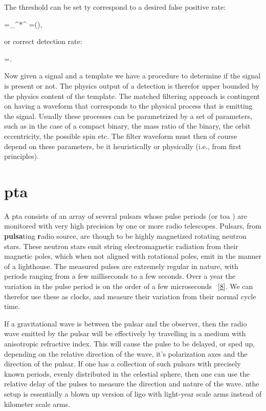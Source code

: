 \documentclass[
  10pt,
  a4paper,
  DIV=11,
  numbers=noendperiod,
  twoside]{scrreprt}
\let\[\relax \let\]\relax %
\DeclareRobustCommand{\[}{\begin{equation}}
\DeclareRobustCommand{\]}{\end{equation}}
\begin{document}
The threshold can be set ty correspond to a desired false positive
rate:

\[=\sqrt{\inv{2\pi}}\int\limits_{\rho^*}^{\infty} \dd{\rho}=\half {}(),\]

or correct detection rate:

\[
=\Half{}.  
\]

Now given a signal and a template we have a procedure to determine if
the signal is present or not. The physics output of a detection is
therefor upper bounded by the physics content of the template. The
matched filtering approach is contingent on having a waveform that
corresponds to the physical process that is emitting the signal. Usually
these processes can be parametrized by a set of parameters, such as in
the case of a compact binary, the mass ratio of the binary, the orbit
eccentricity, the possible spin etc. The filter waveform must then of
course depend on these parameters, be it heuristically or physically
(i.e., from first principles).

\hypertarget{pta}{%
\section{\texorpdfstring{\gls{pta}}{}}\label{pta}}

A \gls{pta} consists of an array of several pulsars whose pulse periods
(or \gls{toa} ) are monitored with very high precision by one or more
radio telescopes. Pulsars, from \textbf{pulsa}ting \textbf{r}adio
source, are though to be highly magnetized rotating neutron stars. These
neutron stars emit string electromagnetic radiation from their magnetic
poles, which when not aligned with rotational poles, emit in the manner
of a lighthouse. The measured pulses are extremely regular in nature,
with periods ranging from a few milliseconds to a few seconds. Over a
year the variation in the pulse period is on the order of a few
microseconds ~{[}\protect\hyperlink{ref-Detweiler:1979wn}{8}{]}. We can
therefor use these as clocks, and measure their variation from their
normal cycle time.

If a gravitational wave is between the pulsar and the observer, then the
radio wave emitted by the pulsar will be effectively by travelling in a
medium with anisotropic refractive index. This will cause the pulse to
be delayed, or sped up, depending on the relative direction of the wave,
it's polarization axes and the direction of the pulsar. If one has a
collection of such pulsars with precisely known periods, evenly
distributed in the celestial sphere, then one can use the relative delay
of the pulses to measure the direction and nature of the wave. nthe
setup is essentially a blown up version of \gls{ligo} with light-year
scale arms instead of kilometer scale arms.
\end{document}
